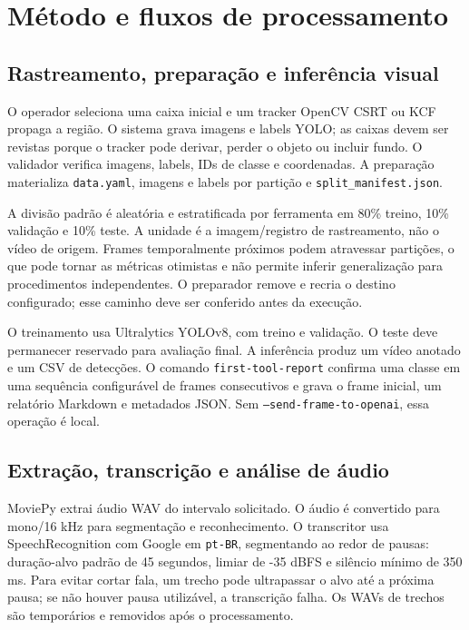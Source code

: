 \documentclass[12pt,a4paper]{article}
\begin{document}
\section{Método e fluxos de processamento}

\subsection{Rastreamento, preparação e inferência visual}

O operador seleciona uma caixa inicial e um tracker OpenCV CSRT ou KCF propaga a região. O sistema grava imagens e labels YOLO; as caixas devem ser revistas porque o tracker pode derivar, perder o objeto ou incluir fundo. O validador verifica imagens, labels, IDs de classe e coordenadas. A preparação materializa \texttt{data.yaml}, imagens e labels por partição e \texttt{split\_manifest.json}.

A divisão padrão é aleatória e estratificada por ferramenta em 80\% treino, 10\% validação e 10\% teste. A unidade é a imagem/registro de rastreamento, não o vídeo de origem. Frames temporalmente próximos podem atravessar partições, o que pode tornar as métricas otimistas e não permite inferir generalização para procedimentos independentes. O preparador remove e recria o destino configurado; esse caminho deve ser conferido antes da execução.

O treinamento usa Ultralytics YOLOv8, com treino e validação. O teste deve permanecer reservado para avaliação final. A inferência produz um vídeo anotado e um CSV de detecções. O comando \texttt{first-tool-report} confirma uma classe em uma sequência configurável de frames consecutivos e grava o frame inicial, um relatório Markdown e metadados JSON. Sem \texttt{--send-frame-to-openai}, essa operação é local.

\subsection{Extração, transcrição e análise de áudio}

MoviePy extrai áudio WAV do intervalo solicitado. O áudio é convertido para mono/16 kHz para segmentação e reconhecimento. O transcritor usa SpeechRecognition com Google em \texttt{pt-BR}, segmentando ao redor de pausas: duração-alvo padrão de 45 segundos, limiar de -35 dBFS e silêncio mínimo de 350 ms. Para evitar cortar fala, um trecho pode ultrapassar o alvo até a próxima pausa; se não houver pausa utilizável, a transcrição falha. Os WAVs de trechos são temporários e removidos após o processamento.
\end{document}
